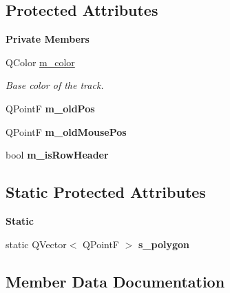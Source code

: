\subsection*{Protected Attributes}
\begin{Indent}\textbf{ Private Members}\par
\begin{DoxyCompactItemize}
\item 
\mbox{\label{classrev_1_1_view_1_1_timeline_marker_a5a6e46e1824d8139e8895536729973d7}} 
Q\+Color \mbox{\hyperlink{classrev_1_1_view_1_1_timeline_marker_a5a6e46e1824d8139e8895536729973d7}{m\+\_\+color}}
\begin{DoxyCompactList}\small\item\em Base color of the track. \end{DoxyCompactList}\item 
\mbox{\label{classrev_1_1_view_1_1_timeline_marker_a44b14be33ee7ae724e39bf78c8c0d50f}} 
Q\+PointF {\bfseries m\+\_\+old\+Pos}
\item 
\mbox{\label{classrev_1_1_view_1_1_timeline_marker_a6f78be6041d6527a81c742438276d2f0}} 
Q\+PointF {\bfseries m\+\_\+old\+Mouse\+Pos}
\item 
\mbox{\label{classrev_1_1_view_1_1_timeline_marker_a3871289a05fb6b0f9f86f8bbcbd1410d}} 
bool {\bfseries m\+\_\+is\+Row\+Header}
\end{DoxyCompactItemize}
\end{Indent}
\subsection*{Static Protected Attributes}
\begin{Indent}\textbf{ Static}\par
\begin{DoxyCompactItemize}
\item 
static Q\+Vector$<$ Q\+PointF $>$ {\bfseries s\+\_\+polygon}
\end{DoxyCompactItemize}
\end{Indent}


\subsection{Member Data Documentation}
\mbox{\label{classrev_1_1_view_1_1_timeline_marker_a4ffe0c91df6b507815901b82385f70d6}} 
